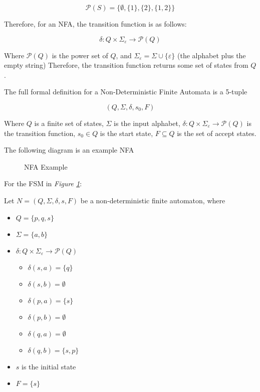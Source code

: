 \documentclass[11pt]{article}
\begin{document}
$$\mathcal{P}(S)=\{\emptyset,\{1\}, \{2\}, \{1,2\}\}$$

Therefore, for an NFA, the transition function is as follows:

$$\delta : Q \times \Sigma_\varepsilon \to \mathcal{P}(Q)$$

Where $\mathcal{P}(Q)$ is the power set of $Q$, and $\Sigma_\varepsilon = \Sigma
\cup \{\varepsilon\}$ (the alphabet plus the empty string) Therefore, the
transition function returns some set of states from $Q$.

The full formal definition for a Non-Deterministic Finite Automata is a 5-tuple

$$ (Q, \Sigma, \delta, s_0, F) $$

Where $Q$ is a finite set of states, $\Sigma$ is the input alphabet, $\delta : Q
\times \Sigma_\varepsilon \to \mathcal{P}(Q)$ is the transition function, $s_0
\in Q$ is the start state, $F \subseteq Q$ is the set of accept states.

The following diagram is an example NFA

\begin{figure}[H]
	\centering
	\caption{NFA Example}
	\label{fig:nfaexample}
\end{figure}


For the FSM in \emph{Figure \ref{fig:nfaexample}}:

Let $N=(Q,\Sigma,\delta,s,F)$ be a non-deterministic finite automaton, where

\begin{itemize}
	\item $Q = \{p, q, s\}$
	\item $\Sigma = \{a, b\}$
  \item $\delta : Q \times \Sigma_\varepsilon \to \mathcal{P}(Q)$
		\begin{itemize}
			\item $\delta(s,a)=\{q\}$
			\item $\delta(s,b)=\emptyset$
			\item $\delta(p,a)=\{s\}$
			\item $\delta(p,b)=\emptyset$
			\item $\delta(q,a)=\emptyset$
			\item $\delta(q,b)=\{s,p\}$
		\end{itemize}
	\item $s$ is the initial state
	\item $F = \{s\}$
\end{itemize}
\end{document}
